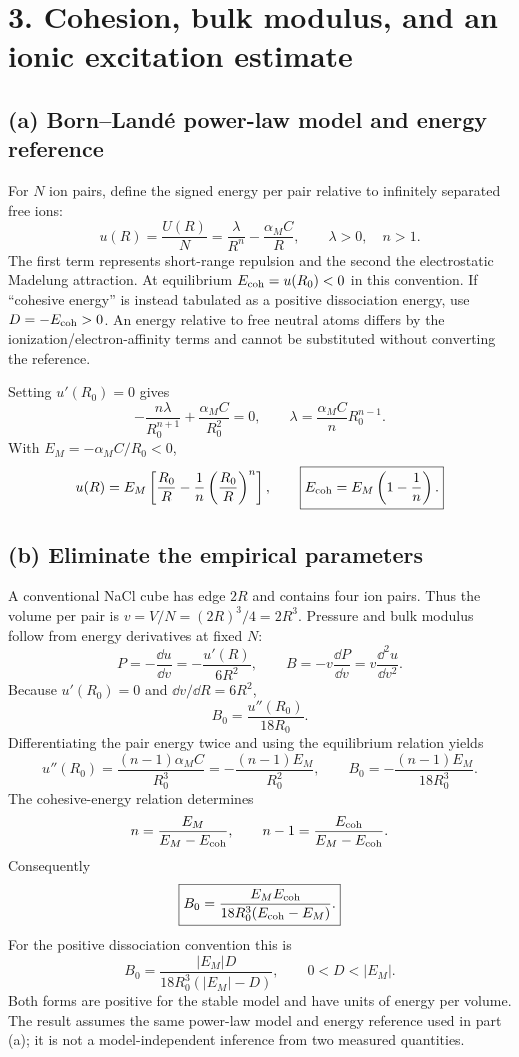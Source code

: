 \section*{3. Cohesion, bulk modulus, and an ionic excitation estimate}
\subsection*{(a) Born--Land\'e power-law model and energy reference}
For $N$ ion pairs, define the signed energy per pair relative to infinitely separated free ions:
\[
\boxed{u(R)=\frac{U(R)}N=\frac{\lambda}{R^n}-\frac{\alpha_M C}{R},
\qquad \lambda>0,\quad n>1.}
\]
The first term represents short-range repulsion and the second the electrostatic Madelung attraction. At equilibrium $E_{\rm coh}=u(R_0)<0$ in this convention. If ``cohesive energy'' is instead tabulated as a positive dissociation energy, use $D=-E_{\rm coh}>0$. An energy relative to free neutral atoms differs by the ionization/electron-affinity terms and cannot be substituted without converting the reference.

Setting $u'(R_0)=0$ gives
\[
-\frac{n\lambda}{R_0^{n+1}}+\frac{\alpha_M C}{R_0^2}=0,
\qquad
\lambda=\frac{\alpha_M C}{n}R_0^{n-1}.
\]
With $E_M=-\alpha_M C/R_0<0$,
\[
u(R)=E_M\left[\frac{R_0}{R}-\frac1n
\left(\frac{R_0}{R}\right)^n\right],\qquad
\boxed{E_{\rm coh}=E_M\left(1-\frac1n\right).}
\]

\subsection*{(b) Eliminate the empirical parameters}
A conventional NaCl cube has edge $2R$ and contains four ion pairs. Thus the volume per pair is $v=V/N=(2R)^3/4=2R^3$. Pressure and bulk modulus follow from energy derivatives at fixed $N$:
\[
P=-\frac{\dd u}{\dd v}=-\frac{u'(R)}{6R^2},\qquad
B=-v\frac{\dd P}{\dd v}=v\frac{\dd^2u}{\dd v^2}.
\]
Because $u'(R_0)=0$ and $\dd v/\dd R=6R^2$,
\[
B_0=\frac{u''(R_0)}{18R_0}.
\]
Differentiating the pair energy twice and using the equilibrium relation yields
\[
u''(R_0)=\frac{(n-1)\alpha_M C}{R_0^3}
=-\frac{(n-1)E_M}{R_0^2},
\qquad
B_0=-\frac{(n-1)E_M}{18R_0^3}.
\]
The cohesive-energy relation determines
\[
n=\frac{E_M}{E_M-E_{\rm coh}},\qquad
n-1=\frac{E_{\rm coh}}{E_M-E_{\rm coh}}.
\]
Consequently
\[
\boxed{B_0=\frac{E_M E_{\rm coh}}
{18R_0^3(E_{\rm coh}-E_M)}.}
\]
For the positive dissociation convention this is
\[
\boxed{B_0=\frac{|E_M|D}{18R_0^3(|E_M|-D)},\qquad 0<D<|E_M|.}
\]
Both forms are positive for the stable model and have units of energy per volume. The result assumes the same power-law model and energy reference used in part (a); it is not a model-independent inference from two measured quantities.

